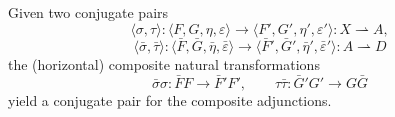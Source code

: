 Given two conjugate pairs
\[
\langle \sigma, \tau \rangle : \langle F, G, \eta, \varepsilon \rangle \to \langle F', G', \eta', \varepsilon' \rangle : X \rightharpoonup A,
\]
\[
\langle \bar{\sigma}, \bar{\tau} \rangle : \langle \bar{F}, \bar{G}, \bar{\eta}, \bar{\varepsilon} \rangle \to \langle \bar{F}', \bar{G}', \bar{\eta}', \bar{\varepsilon}' \rangle : A \rightharpoonup D
\]
the (horizontal) composite natural transformations
\[
\bar{\sigma}\sigma : \bar{F}F \to \bar{F}'F', \qquad \tau\bar{\tau} : \bar{G}' G' \to G \bar{G}
\]
yield a conjugate pair for the composite adjunctions.
